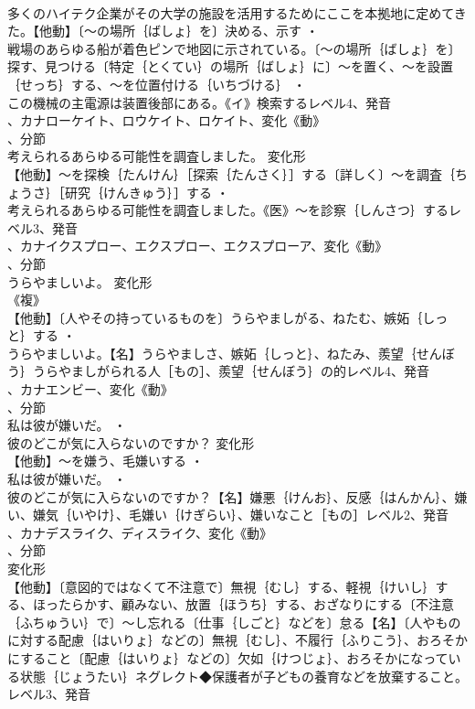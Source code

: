 \documentclass[8pt]{extreport}
\begin{document}
\begin{CJK}{UTF8}{min}
\\	多くのハイテク企業がその大学の施設を活用するためにここを本拠地に定めてきた。【他動】〔～の場所｛ばしょ｝を〕決める、示す ・
\\	戦場のあらゆる船が着色ピンで地図に示されている。〔～の場所｛ばしょ｝を〕探す、見つける〔特定｛とくてい｝の場所｛ばしょ｝に〕～を置く、～を設置｛せっち｝する、～を位置付ける｛いちづける｝ ・
\\	この機械の主電源は装置後部にある。《イ》検索するレベル4、発音
\\	、カナローケイト、ロウケイト、ロケイト、変化《動》
\\	、分節
\\	考えられるあらゆる可能性を調査しました。	変化形 
\\	【他動】～を探検｛たんけん｝［探索｛たんさく｝］する〔詳しく〕～を調査｛ちょうさ｝［研究｛けんきゅう｝］する ・
\\	考えられるあらゆる可能性を調査しました。《医》～を診察｛しんさつ｝するレベル3、発音
\\	、カナイクスプロー、エクスプロー、エクスプローア、変化《動》
\\	、分節
\\	うらやましいよ。	変化形 
\\	《複》
\\	【他動】〔人やその持っているものを〕うらやましがる、ねたむ、嫉妬｛しっと｝する ・
\\	うらやましいよ。【名】うらやましさ、嫉妬｛しっと｝、ねたみ、羨望｛せんぼう｝うらやましがられる人［もの］、羨望｛せんぼう｝の的レベル4、発音
\\	、カナエンビー、変化《動》
\\	、分節
\\	私は彼が嫌いだ。 ・
\\	彼のどこが気に入らないのですか？	変化形 
\\	【他動】～を嫌う、毛嫌いする ・
\\	私は彼が嫌いだ。 ・
\\	彼のどこが気に入らないのですか？【名】嫌悪｛けんお｝、反感｛はんかん｝、嫌い、嫌気｛いやけ｝、毛嫌い｛けぎらい｝、嫌いなこと［もの］レベル2、発音
\\	、カナデスライク、ディスライク、変化《動》
\\	、分節
\\	変化形 
\\	【他動】〔意図的ではなくて不注意で〕無視｛むし｝する、軽視｛けいし｝する、ほったらかす、顧みない、放置｛ほうち｝する、おざなりにする〔不注意｛ふちゅうい｝で〕～し忘れる〔仕事｛しごと｝などを〕怠る【名】〔人やものに対する配慮｛はいりょ｝などの〕無視｛むし｝、不履行｛ふりこう｝、おろそかにすること〔配慮｛はいりょ｝などの〕欠如｛けつじょ｝、おろそかになっている状態｛じょうたい｝ネグレクト◆保護者が子どもの養育などを放棄すること。レベル3、発音

\end{CJK}
\end{document}
